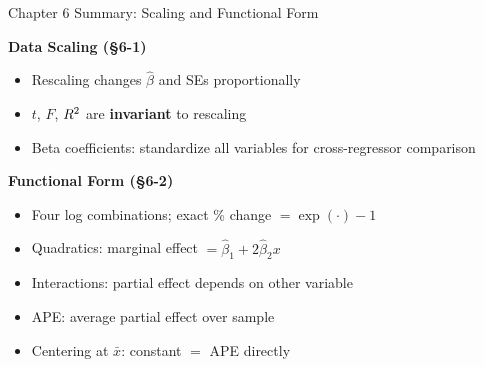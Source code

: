 \documentclass[aspectratio=169, 12pt]{beamer}
\begin{document}
\begin{frame}[shrink=8]{Chapter 6 Summary: Scaling and Functional Form}

      \begin{keybox}
        \textbf{Data Scaling (\S6-1)}
        \begin{itemize}
          \item Rescaling changes $\hat\beta$ and SEs proportionally
          \item $t$, $F$, $R^2$ are \textbf{invariant} to rescaling
          \item Beta coefficients: standardize all variables for
                cross-regressor comparison
        \end{itemize}
      \end{keybox}
  \medskip

      \begin{keybox}
        \textbf{Functional Form (\S6-2)}
        \begin{itemize}
          \item Four log combinations; exact \% change $= \exp(\cdot) - 1$
          \item Quadratics: marginal effect $= \hat\beta_1 + 2\hat\beta_2 x$
          \item Interactions: partial effect depends on other variable
          \item APE: average partial effect over sample
          \item Centering at $\bar{x}$: constant $=$ APE directly
        \end{itemize}
      \end{keybox}

\end{frame}
\end{document}
